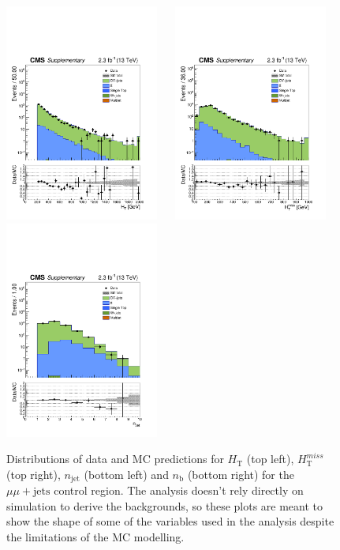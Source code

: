 \clearpage
\begin{figure}[tbhp]
    \caption{ 
    Distributions of data and MC predictions for $H_{\mathrm{T}}$ (top left), $H_{\mathrm{T}}^{miss}$ (top right), $n_{\mathrm{jet}}$ (bottom left) and $n_{\mathrm{b}}$ (bottom right) 
    for the $\mu\mu+\mathrm{jets}$ control region. 
    The analysis doesn't rely directly on simulation to derive the backgrounds, 
    so these plots are meant to show the shape of some of the variables used in the analysis despite the limitations 
    of the MC modelling. 
    \label{fig:data-MC_plots_DoubleMu} }
  \begin{center}
     \includegraphics[width=0.45\textwidth]{DoubleMu_ht40_all_all_aux} ~~
     \includegraphics[width=0.45\textwidth]{DoubleMu_mht40_pt_all_all_aux} \\
     \includegraphics[width=0.45\textwidth]{DoubleMu_nJet40_all_all_aux} ~~

\end{center}
\end{figure}
